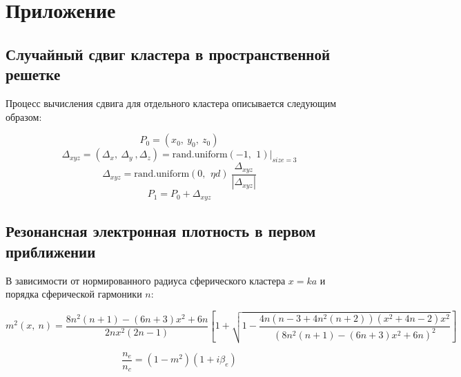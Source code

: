 \newpage
\section*{Приложение}
\subsection*{Случайный сдвиг кластера в пространственной решетке}

Процесс вычисления сдвига для отдельного кластера описывается следующим образом:

    \begin{equation}
        P_0 = (x_0,\:y_0,\:z_0)
        \label{random_shifts}
    \end{equation}
    \begin{equation*}
        \Delta_{xyz} = (\Delta_x,\: \Delta_y\:, \Delta_z) = \textrm{rand.uniform}\left( -1,\:\,1 \right)|_{size=3}
    \end{equation*}
    \begin{equation*}
        \Delta_{xyz} = \textrm{rand.uniform}\left(0,\:\,\eta d \right)\:\frac{\Delta_{xyz}}{|\Delta_{xyz}|}
    \end{equation*}
    \begin{equation*}
        P_1 = P_0 + \Delta_{xyz}
    \end{equation*}

\subsection*{Резонансная электронная плотность в первом приближении}

В зависимости от нормированного радиуса сферического кластера $x = ka$ и порядка сферической гармоники $n$:

\begin{equation}
    m^2 \left(x,\:n \right) = \frac{8n^2 (n + 1) - (6n + 3)x^2 + 6n}{2n x^2 (2n-1)} \left[ 1 + \sqrt{ 1 - \frac{4n (n-3 + 4n^2 (n + 2)) (x^2 + 4n-2) x^2}{{\left(8n^2 (n + 1) - (6n + 3)x^2 + 6n \right)}^{2}} } \right]
    \label{m2_resonance}
\end{equation}

\begin{equation}
    \frac{n_e}{n_c} = (1 - m^2) (1 + i \beta_e)
    \label{nenc_resonance}
\end{equation}